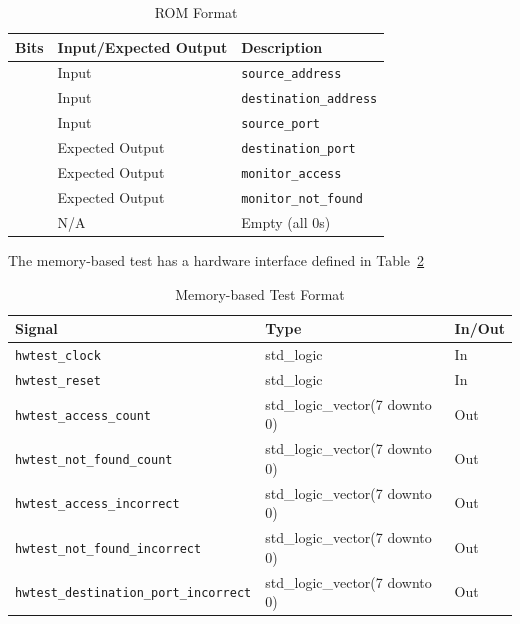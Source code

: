 \documentclass{article}
\begin{document}
\begin{table}[ht]
    \begin{center}
        \begin{tabular}{lll}\hline
        Bits & Input/Expected Output & Description \\
        \hline
        [47:0] & Input & \texttt{source\_address} \\
        \hline
        [95:48] & Input & \texttt{destination\_address} \\
        \hline
        [99:96] & Input & \texttt{source\_port} \\
        \hline
        [103:100] & Expected Output & \texttt{destination\_port} \\
        \hline
        [104] & Expected Output & \texttt{monitor\_access} \\
       	\hline
        [105] & Expected Output & \texttt{monitor\_not\_found} \\
        \hline
        [127:106] & N/A & Empty (all 0s) \\
        \hline
        \end{tabular}
        \caption{ROM Format}\label{tab:rom}
    \end{center}
\end{table}

The memory-based test has a hardware interface defined in Table~\ref{tab:test2}

\begin{table}[ht]
    \begin{center}
        \begin{tabular}{lll}\hline
        Signal & Type & In/Out \\
        \hline
        \texttt{hwtest\_clock} & std\_logic & In \\
        \hline
        \texttt{hwtest\_reset} & std\_logic & In \\
        \hline
        \texttt{hwtest\_access\_count} & std\_logic\_vector(7 downto 0) & Out \\
        \hline
        \texttt{hwtest\_not\_found\_count} & std\_logic\_vector(7 downto 0) & Out \\
        \hline
        \texttt{hwtest\_access\_incorrect} & std\_logic\_vector(7 downto 0) & Out \\
        \hline
        \texttt{hwtest\_not\_found\_incorrect} & std\_logic\_vector(7 downto 0) & Out \\
        \hline
        \texttt{hwtest\_destination\_port\_incorrect} & std\_logic\_vector(7 downto 0) & Out \\
        \hline
        \end{tabular}
        \caption{Memory-based Test Format}\label{tab:test2}
    \end{center}
\end{table}
\end{document}
